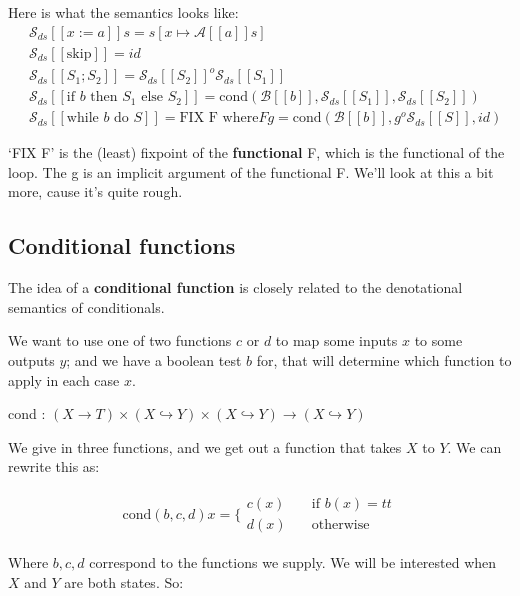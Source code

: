 \documentclass[11pt,a4paper,headsepline,titlepage,dvipsnames,cmyk]{scrartcl}
\newcommand\pfun{\hookrightarrow}
\begin{document}
Here is what the semantics looks like:
\begin{align*}
    &\mathcal{S}_{ds} [\![x:=a]\!] s = s[x \mapsto \mathcal{A}[\![a]\!]s]
    \\
    &\mathcal{S}_{ds}[\![\text{skip}]\!] = id \\
    &\mathcal{S}_{ds}[\![S_1;S_2]\!] =
    \mathcal{S}_{ds}[\![S_2]\!]^o\mathcal{S}_{ds}[\![S_1]\!] \\
    &\mathcal{S}_{ds}[\![\text{if } b \text{ then } S_1 \text{ else }
    S_2]\!] =
    \text{cond}(\mathcal{B}[\![b]\!],\mathcal{S}_{ds}[\![S_1]\!],\mathcal{S}_{ds}[\![S_2]\!]) \\
    &\mathcal{S}_{ds}[\![\text{while } b \text{ do } S]\!] = \text{FIX F
    where} F g =
    \text{cond}(\mathcal{B}[\![b]\!],g^o\mathcal{S}_{ds}[\![S]\!],id)
\end{align*}

`FIX F' is the (least) fixpoint of the \textbf{functional} F, which is the
functional of the loop. The g is an implicit argument of the functional F.
We'll look at this a bit more, cause it's quite rough.

\subsection{Conditional functions}%
\label{sub:conditional-func}
The idea of a \textbf{conditional function} is closely related to the
denotational semantics of conditionals.

We want to use one of two functions $c$ or $d$ to map some inputs $x$ to
some outputs $y$; and we have a boolean test $b$ for, that will determine
which function to apply in each case $x$.

\begin{center}
cond : $(X \rightarrow T) \times (X \pfun Y) \times (X \pfun Y)
\rightarrow (X \pfun Y)$
\end{center}

We give in three functions, and we get out a function that takes $X$ to
$Y$. We can rewrite this as:

\begin{align*}
    \text{cond}(b,c,d)x = \Bigg \{
        \begin{split}
            c(x) \quad &\text{if } b(x) = tt \\
            d(x) \quad &\text{otherwise}
        \end{split}
\end{align*}

Where $b, c, d$ correspond to the functions we supply. We will be
interested when $X$ and $Y$ are both states. So:
\end{document}
